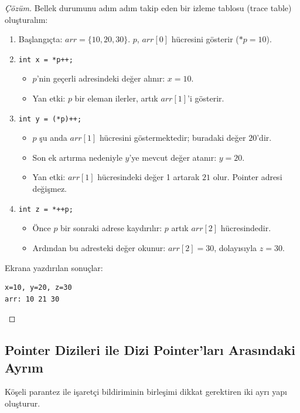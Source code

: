 \begin{proof}[Çözüm]
Bellek durumunu adım adım takip eden bir izleme tablosu (trace table) oluşturalım:

\begin{enumerate}
    \item Başlangıçta: $arr = \{10, 20, 30\}$. $p$, $arr[0]$ hücresini gösterir ($*p = 10$).
    \item \texttt{int x = *p++;}
    \begin{itemize}
        \item $p$'nin geçerli adresindeki değer alınır: $x = 10$.
        \item Yan etki: $p$ bir eleman ilerler, artık $arr[1]$'i gösterir.
    \end{itemize}
    \item \texttt{int y = (*p)++;}
    \begin{itemize}
        \item $p$ şu anda $arr[1]$ hücresini göstermektedir; buradaki değer $20$'dir.
        \item Son ek artırma nedeniyle $y$'ye mevcut değer atanır: $y = 20$.
        \item Yan etki: $arr[1]$ hücresindeki değer 1 artarak $21$ olur. Pointer adresi değişmez.
    \end{itemize}
    \item \texttt{int z = *++p;}
    \begin{itemize}
        \item Önce $p$ bir sonraki adrese kaydırılır: $p$ artık $arr[2]$ hücresindedir.
        \item Ardından bu adresteki değer okunur: $arr[2] = 30$, dolayısıyla $z = 30$.
    \end{itemize}
\end{enumerate}

Ekrana yazdırılan sonuçlar:
\begin{lstlisting}[language=CTemel]
x=10, y=20, z=30
arr: 10 21 30
\end{lstlisting}
\end{proof}

\subsection{Pointer Dizileri ile Dizi Pointer'ları Arasındaki Ayrım}

Köşeli parantez ile işaretçi bildiriminin birleşimi dikkat gerektiren iki ayrı yapı oluşturur.

